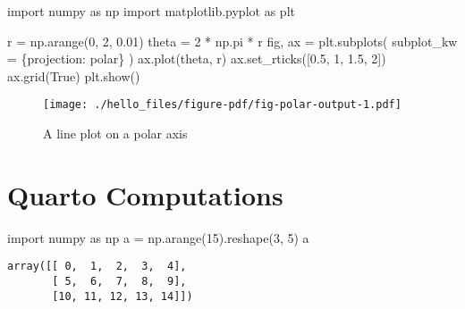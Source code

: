 \documentclass[
  letterpaper,
  DIV=11,
  numbers=noendperiod]{scrreprt}
\newenvironment{Shaded}{\begin{snugshade}}{\end{snugshade}}
\newcommand{\DecValTok}[1]{\textcolor[rgb]{0.68,0.00,0.00}{#1}}
\newcommand{\FloatTok}[1]{\textcolor[rgb]{0.68,0.00,0.00}{#1}}
\newcommand{\ImportTok}[1]{\textcolor[rgb]{0.00,0.46,0.62}{#1}}
\newcommand{\NormalTok}[1]{\textcolor[rgb]{0.00,0.23,0.31}{#1}}
\newcommand{\OperatorTok}[1]{\textcolor[rgb]{0.37,0.37,0.37}{#1}}
\newcommand{\StringTok}[1]{\textcolor[rgb]{0.13,0.47,0.30}{#1}}
\newcommand{\VariableTok}[1]{\textcolor[rgb]{0.07,0.07,0.07}{#1}}
\begin{document}
\begin{Shaded}
\begin{Highlighting}[]
\ImportTok{import}\NormalTok{ numpy }\ImportTok{as}\NormalTok{ np}
\ImportTok{import}\NormalTok{ matplotlib.pyplot }\ImportTok{as}\NormalTok{ plt}

\NormalTok{r }\OperatorTok{=}\NormalTok{ np.arange(}\DecValTok{0}\NormalTok{, }\DecValTok{2}\NormalTok{, }\FloatTok{0.01}\NormalTok{)}
\NormalTok{theta }\OperatorTok{=} \DecValTok{2} \OperatorTok{*}\NormalTok{ np.pi }\OperatorTok{*}\NormalTok{ r}
\NormalTok{fig, ax }\OperatorTok{=}\NormalTok{ plt.subplots(}
\NormalTok{  subplot\_kw }\OperatorTok{=}\NormalTok{ \{}\StringTok{\textquotesingle{}projection\textquotesingle{}}\NormalTok{: }\StringTok{\textquotesingle{}polar\textquotesingle{}}\NormalTok{\}}
\NormalTok{)}
\NormalTok{ax.plot(theta, r)}
\NormalTok{ax.set\_rticks([}\FloatTok{0.5}\NormalTok{, }\DecValTok{1}\NormalTok{, }\FloatTok{1.5}\NormalTok{, }\DecValTok{2}\NormalTok{])}
\NormalTok{ax.grid(}\VariableTok{True}\NormalTok{)}
\NormalTok{plt.show()}
\end{Highlighting}
\end{Shaded}

\begin{figure}[H]

{\centering \texttt{[image: ./hello\_files/figure-pdf/fig-polar-output-1.pdf]}

}

\caption{\label{fig-polar}A line plot on a polar axis}

\end{figure}


\hypertarget{quarto-computations}{%
\chapter{Quarto Computations}\label{quarto-computations}}

\begin{Shaded}
\begin{Highlighting}[]
\ImportTok{import}\NormalTok{ numpy }\ImportTok{as}\NormalTok{ np}
\NormalTok{a }\OperatorTok{=}\NormalTok{ np.arange(}\DecValTok{15}\NormalTok{).reshape(}\DecValTok{3}\NormalTok{, }\DecValTok{5}\NormalTok{)}
\NormalTok{a}
\end{Highlighting}
\end{Shaded}

\begin{verbatim}
array([[ 0,  1,  2,  3,  4],
       [ 5,  6,  7,  8,  9],
       [10, 11, 12, 13, 14]])
\end{verbatim}
\end{document}
